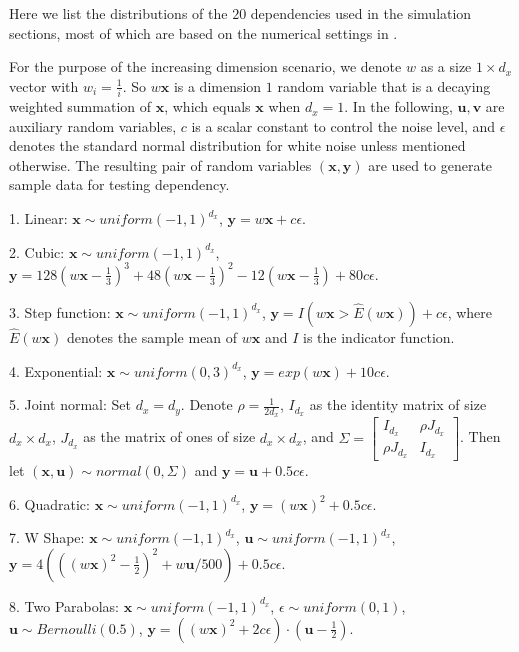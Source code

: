 \documentclass[11pt]{article}
\providecommand{\mb}[1]{\boldsymbol{#1}}
\begin{document}
Here we list the distributions of the $20$ dependencies used in the simulation sections, most of which are based on the numerical settings in \cite{SzekelyRizzoBakirov2007, SimonTibshirani2012, SimonTibshirani2012, GorfineHellerHeller2012}. 

For the purpose of the increasing dimension scenario, we denote $w$ as a size $1 \times d_{x}$ vector with $w_{i}=\frac{1}{i}$. So $w\mb{x}$ is a dimension $1$ random variable that is a decaying weighted summation of $\mb{x}$, which equals $\mb{x}$ when $d_{x}=1$. In the following, $\mb{u}, \mb{v}$ are auxiliary random variables, $c$ is a scalar constant to control the noise level, and $\epsilon$ denotes the standard normal distribution for white noise unless mentioned otherwise. The resulting pair of random variables $(\mb{x},\mb{y})$ are used to generate sample data for testing dependency.

1. Linear: $\mb{x} \sim uniform(-1,1)^{d_{x}}$, $\mb{y}=w\mb{x}+c\epsilon$. 

2. Cubic: $\mb{x} \sim uniform(-1,1)^{d_{x}}$, $\mb{y}=128(w\mb{x}-\frac{1}{3})^3+48(w\mb{x}-\frac{1}{3})^2-12(w\mb{x}-\frac{1}{3})+80c\epsilon$.

3. Step function: $\mb{x} \sim uniform(-1,1)^{d_{x}}$, $\mb{y}=I(w\mb{x}>\hat{E}(w\mb{x}))+c\epsilon$, where $\hat{E}(w\mb{x})$ denotes the sample mean of $w\mb{x}$ and $I$ is the indicator function. 

4. Exponential: $\mb{x} \sim uniform(0,3)^{d_{x}}$, $\mb{y}=exp(w\mb{x})+10c\epsilon$.

5. Joint normal: Set $d_{x}=d_{y}$. Denote $\rho=\frac{1}{2d_{x}}$, $I_{d_{x}}$ as the identity matrix of size $d_{x} \times d_{x}$, $J_{d_{x}}$ as the matrix of ones of size $d_{x} \times d_{x}$, and $\Sigma = \begin{bmatrix} I_{d_{x}}&\rho J_{d_{x}}\\ \rho J_{d_{x}}&I_{d_{x}} \end{bmatrix}$. Then let $(\mb{x},\mb{u}) \sim normal(0, \Sigma)$ and $\mb{y}=\mb{u}+0.5c\epsilon$.

6. Quadratic: $\mb{x} \sim uniform(-1,1)^{d_{x}}$, $\mb{y}=(w\mb{x})^2+0.5c\epsilon$.

7. W Shape: $\mb{x} \sim uniform(-1,1)^{d_{x}}$, $\mb{u} \sim uniform(-1,1)^{d_{x}}$, $\mb{y}=4( ( (w\mb{x})^2 - \frac{1}{2} )^2 + w\mb{u}/500 )+0.5c\epsilon$.

8. Two Parabolas: $\mb{x} \sim uniform(-1,1)^{d_{x}}$, $\epsilon \sim uniform(0,1)$, $\mb{u} \sim Bernoulli(0.5)$, $\mb{y}=( (w\mb{x})^2  + 2c\epsilon) \cdot (\mb{u}-\frac{1}{2})$.
\end{document}
